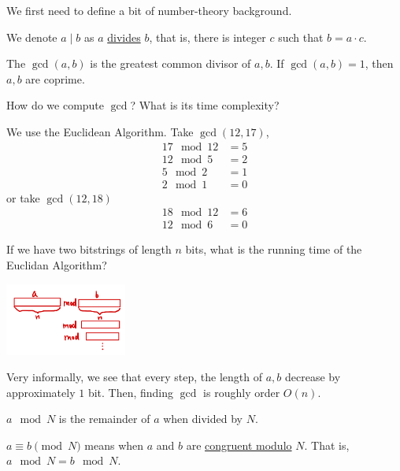 We first need to define a bit of number-theory background.
\begin{definition}
    We denote $a\mid b$ as $a$ \ul{divides} $b$, that is, there is integer $c$ such that $b = a\cdot c$.
\end{definition}
\begin{definition}
    The $\gcd(a, b)$ is the greatest common divisor of $a, b$. If $\gcd(a, b) = 1$, then $a, b$ are coprime.
\end{definition}
\begin{ques*}
    How do we compute $\gcd$? What is its time complexity?
\end{ques*}
\begin{example*}
    We use the Euclidean Algorithm. Take $\gcd(12, 17)$,
    \begin{align*}
        17\mod{12} & = 5 \\
        12 \mod{5} & = 2 \\
        5\mod{2}   & = 1 \\
        2\mod{1}   & = 0
    \end{align*}
    or take $\gcd(12, 18)$
    \begin{align*}
        18\mod{12} & = 6 \\
        12\mod{6}  & = 0
    \end{align*}
\end{example*}
If we have two bitstrings of length $n$ bits, what is the running time of the Euclidan Algorithm?

\begin{center}
    \includegraphics[width=0.3\textwidth]{images/2023-01-31/euclidean-algo.png}
\end{center}

Very informally, we see that every step, the length of $a, b$ decrease by approximately $1$ bit. Then, finding $\gcd$ is roughly order $O(n)$.

\begin{definition}[Mod]
    $a\mod{N}$ is the remainder of $a$ when divided by $N$.

    $a\equiv b\pmod{N}$ means when $a$ and $b$ are \ul{congruent modulo} $N$. That is, $a\mod N = b\mod N$.
\end{definition}

